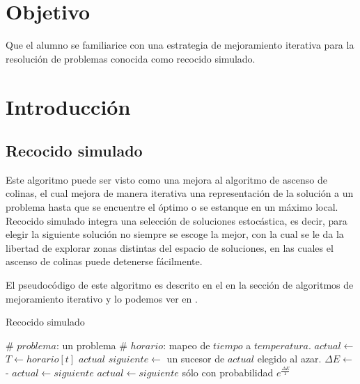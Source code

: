 \section{Objetivo}

Que el alumno se familiarice con una estrategia de mejoramiento iterativa para la resolución de problemas conocida como recocido simulado.



\section{Introducción}

\subsection{Recocido simulado}

Este algoritmo puede ser visto como una mejora al algoritmo de ascenso de colinas, el cual mejora de manera iterativa una representación de la solución a un problema hasta que se encuentre el óptimo o se estanque en un máximo local.  Recocido simulado integra una selección de soluciones estocástica, es decir, para elegir la siguiente solución no siempre se escoge la mejor, con la cual se le da la libertad de explorar zonas distintas del espacio de soluciones, en las cuales el ascenso de colinas puede detenerse fácilmente.

El pseudocódigo de este algoritmo es descrito en el \cite{Russell2010} en la sección de algoritmos de mejoramiento iterativo y lo podemos ver en .

\begin{algorithm}
 \caption{Recocido simulado}\label{alg:annealing}
 \begin{algorithmic}
    \State \# $problema$: un problema
    \State \# $horario$: mapeo de $tiempo$ a $temperatura$.
    \State $actual \leftarrow $ 
      \State $T \leftarrow horario[t]$
       \Return $actual$ \EndIf
      \State $siguiente \leftarrow$ un sucesor de $actual$ elegido al azar.
      \State $\Delta E \leftarrow$  - 
        \State $actual \leftarrow siguiente$
      \Else
        \State $actual \leftarrow siguiente$ sólo con probabilidad $e^{\frac{\Delta E}{T}}$
      \EndIf
    \EndFor
  \EndFunction
 \end{algorithmic}
\end{algorithm}



